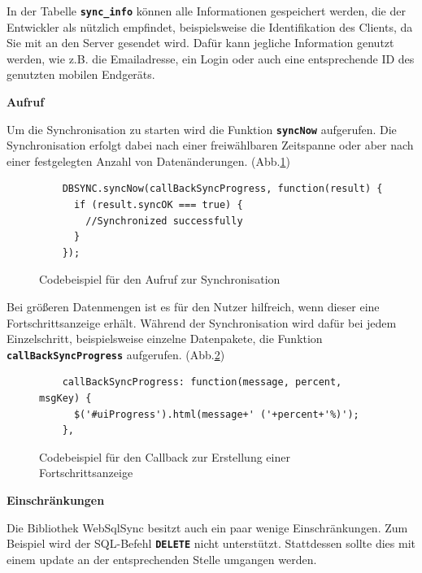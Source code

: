 \hspace{1 cm}

In der Tabelle \textbf{\lstinline$sync_info$} können alle Informationen gespeichert werden, die der Entwickler als nützlich empfindet, beispielsweise die Identifikation des Clients, da Sie mit an den Server gesendet wird. Dafür kann jegliche Information genutzt werden, wie z.B. die Emailadresse, ein Login oder auch eine entsprechende \ac{ID} des genutzten mobilen Endgeräts.

\textbf{Aufruf}

Um die Synchronisation zu starten wird die Funktion \textbf{\lstinline$syncNow$} aufgerufen. Die Synchronisation erfolgt dabei nach einer freiwählbaren Zeitspanne oder aber nach einer festgelegten Anzahl von Datenänderungen. (Abb.\ref{code:syncnow})

\begin{figure}[htb]
	\lstset{language=html}
	\begin{lstlisting}
	DBSYNC.syncNow(callBackSyncProgress, function(result) {
	  if (result.syncOK === true) {
	    //Synchronized successfully
	  }
	});
	\end{lstlisting}
	\caption{Codebeispiel für den Aufruf zur Synchronisation}
	\label{code:syncnow}
\end{figure}

\hspace{1 cm}

Bei größeren Datenmengen ist es für den Nutzer hilfreich, wenn dieser eine Fortschrittsanzeige erhält. Während der Synchronisation wird dafür bei jedem Einzelschritt, beispielsweise einzelne Datenpakete, die Funktion \textbf{\lstinline$callBackSyncProgress$} aufgerufen. (Abb.\ref{code:syncprocess})

\begin{figure}[htb]
	\lstset{language=html}
	\begin{lstlisting}
	callBackSyncProgress: function(message, percent, msgKey) {
	  $('#uiProgress').html(message+' ('+percent+'%)');
	},
	\end{lstlisting}
	\caption{Codebeispiel für den Callback zur Erstellung einer Fortschrittsanzeige}
	\label{code:syncprocess}
\end{figure}

\hspace{1 cm}

\textbf{Einschränkungen}

Die Bibliothek WebSqlSync besitzt auch ein paar wenige Einschränkungen. Zum Beispiel wird der \ac{SQL}-Befehl \textbf{\lstinline$DELETE$} nicht unterstützt. Stattdessen sollte dies mit einem update an der entsprechenden Stelle umgangen werden.

